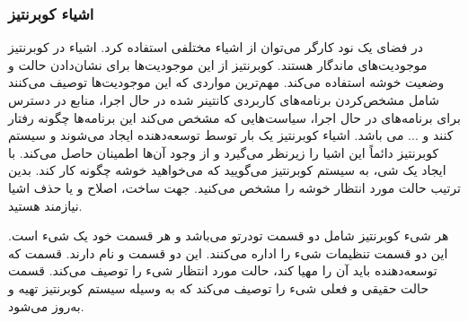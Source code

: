 \subsubsection{اشیاء کوبرنتیز}

در فضای یک نود کارگر می‌توان از اشیاء مختلفی استفاده کرد. اشیاء در کوبرنتیز موجودیت‌های ماندگار هستند. کوبرنتیز از این موجودیت‌ها برای نشان‌دادن حالت و وضعیت خوشه استفاده می‌کند. مهم‌ترین مواردی که این موجودیت‌ها توصیف می‌کنند شامل مشخص‌کردن برنامه‌های کاربردی کانتینر شده در حال اجرا، منابع در دسترس برای برنامه‌های در حال اجرا، سیاست‌هایی که مشخص می‌کند این برنامه‌ها چگونه رفتار کنند و ... می باشد. اشیاء کوبرنتیز یک بار توسط توسعه‌دهنده ایجاد می‌شوند و سیستم کوبرنتیز دائماً این اشیا را زیرنظر می‌گیرد و از وجود آن‌ها اطمینان حاصل می‌کند. با ایجاد یک شی، به سیستم کوبرنتیز می‌گویید که می‌خواهید خوشه چگونه کار کند. بدین ترتیب حالت مورد انتظار خوشه را مشخص می‌کنید. جهت ساخت، اصلاح و یا حذف اشیا نیازمند  هستید.

هر شیء کوبرنتیز شامل دو قسمت تو‌در‌تو می‌باشد و هر قسمت خود یک شیء است. این دو قسمت تنظیمات شیء را اداره می‌کنند. این دو قسمت  و  نام دارند. قسمت  که توسعه‌دهنده باید آن را مهیا کند، حالت مورد انتظار شیء را توصیف می‌کند. قسمت  حالت حقیقی و فعلی شیء را توصیف می‌کند که به وسیله سیستم کوبرنتیز تهیه و به‌روز می‌شود.

\newpage

